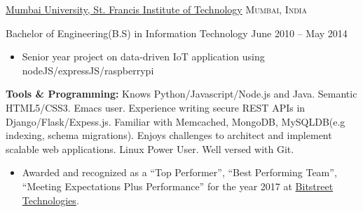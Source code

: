 \documentclass[10pt,a4paper]{article}
\newcommand{\quotes}[1]{``#1''}
\begin{document}
\headedsection
  {\href{http://www.mu.ac.in/}{Mumbai University, St. Francis Institute of Technology}}
  {\textsc{Mumbai, India}} {%
  \headedsubsection
    {Bachelor of Engineering(B.S) in Information Technology}
    {June 2010 -- May 2014}
    {
      \begin{itemize}
        \item Senior year project on data-driven IoT application using nodeJS/expressJS/raspberrypi
      \end{itemize}
    }
}

\spacedhrule{0.5em}{-0.4em}


\inlineheadedsection
{\textbf{Tools \& Programming:}}
{Knows Python/\nsp Javascript/\nsp Node.js} and Java. Semantic HTML5/CSS3. Emacs user. Experience writing secure REST APIs in Django/Flask/Expess.js. Familiar with Memcached, MongoDB, MySQLDB(e.g indexing, schema migrations). Enjoys challenges to architect and implement scalable web applications. Linux Power User. Well versed with Git.

%  

\spacedhrule{1.6em}{-0.4em}

{%
    \begin{itemize}
    \item Awarded and recognized as a \quotes{Top Performer}, \quotes{Best Performing Team}, \quotes{Meeting Expectations Plus Performance} for the year 2017 at {\href{http://bitstreet.in/}{Bitstreet Technologies}}.
    \end{itemize}
}
\end{document}
